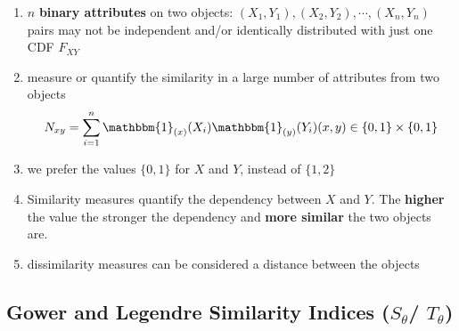 \begin{enumerate}
    \item $n$ \textbf{binary attributes} on two objects: $(X_1, Y_1), (X_2, Y_2), \cdots , (X_n, Y_n)$ \\
    pairs may not be independent and/or identically distributed with just one CDF $F_{XY}$

    \item measure or quantify the similarity in a large number of attributes from two objects
    \[
        N_{xy}
        = \dsum_{i=1}^{n} 
        \mathbbm{1}_{(x)}(X_i)
        \mathbbm{1}_{(y)}(Y_i)
        \hfill
        (x,y) \in \{0,1\} \times \{0,1\}
    \]

    \item we prefer the values $\{0, 1\}$ for $X$ and $Y$, instead of $\{1, 2\}$

    \item Similarity measures quantify the dependency between $X$ and $Y$. The \textbf{higher} the value the stronger the dependency and \textbf{more similar} the two objects are.

    \item dissimilarity measures can be considered a distance between the objects
\end{enumerate}

\subsection{Gower and Legendre Similarity Indices ($S_\theta$/ $T_\theta$) \cite{ism-1}} \label{Gower and Legendre Similarity Indices}

